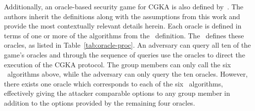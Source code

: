 \documentclass[runningheads]{llncs}
\newcommand{\Abrev}[1]{\gls{#1}}
\begin{document}
Additionally, an oracle-based security game for \Abrev{CGKA} is also defined by~\cite{alwen2020security}.
The authors inherit the definitions along with the assumptions from this work and provide the most contextually relevant details herein.
Each oracle is defined in terms of one or more of the algorithms from the \CGKAdef\ definition.
The \CGKAsec\ defines these oracles, as listed in Table~\ref{tab:oracle-proc}. 
An adversary can query all ten of the game's oracles and through the sequence of queries use the oracles to direct the execution of the \Abrev{CGKA} protocol.
The group members can only call the six \CGKAdef\ algorithms above, while the adversary can only query the ten oracles.
However, there exists one oracle which corresponds to each of the six \CGKAdef\ algorithms, effectively giving the attacker comparable options to any group member in addition to the options provided by the remaining four oracles.
\end{document}
